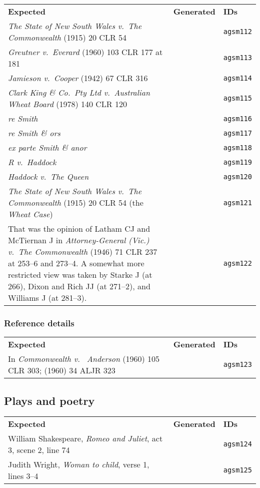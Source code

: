 \documentclass[a4paper,landscape,12pt]{article}
\newlength\q
\newlength\qr
\newenvironment{citetable}
  {\noindent\begin{longtable}{p{\q} p{\q} p{\qr}}\textbf{Expected} & \textbf{Generated} & \textbf{IDs}\\}
  {\end{longtable}}
\begin{document}
\begin{citetable}
	\textit{The State of New South Wales v.~The Commonwealth} (1915) 20 CLR 54 & & \texttt{agsm112} \\
	\textit{Greutner v.~Everard} (1960) 103 CLR 177 at 181 & & \texttt{agsm113} \\
	\textit{Jamieson v.~Cooper} (1942) 67 CLR 316 & & \texttt{agsm114} \\
	\textit{Clark King \& Co.~Pty Ltd v.~Australian Wheat Board} (1978) 140 CLR 120 & & \texttt{agsm115} \\
	\textit{re Smith} & & \texttt{agsm116} \\
	\textit{re Smith \& ors} & & \texttt{agsm117} \\
	\textit{ex parte Smith \& anor} & & \texttt{agsm118} \\
	\textit{R v.~Haddock} & & \texttt{agsm119} \\
	\textit{Haddock v.~The Queen} & & \texttt{agsm120} \\
	\textit{The State of New South Wales v.~The Commonwealth} (1915) 20 CLR 54 (the \textit{Wheat Case}) & & \texttt{agsm121} \\
	That was the opinion of Latham CJ and McTiernan J in \textit{Attorney-General (Vic.) v.~The Commonwealth} (1946) 71 CLR 237 at 253--6 and 273--4.  A somewhat more restricted view was taken by Starke J (at 266), Dixon and Rich JJ (at 271--2), and Williams J (at 281--3). & & \texttt{agsm122} \\
\end{citetable}

\subsubsection{Reference details}

\begin{citetable}
	In \textit{Commonwealth v.~ Anderson} (1960) 105 CLR 303; (1960) 34 ALJR 323 & & \texttt{agsm123} \\
\end{citetable}

\subsection{Plays and poetry}

\begin{citetable}
	William Shakespeare, \textit{Romeo and Juliet}, act 3, scene 2, line 74 & & \texttt{agsm124} \\
	Judith Wright, \textit{Woman to child}, verse 1, lines 3--4 & & \texttt{agsm125} \\
\end{citetable}
\end{document}
